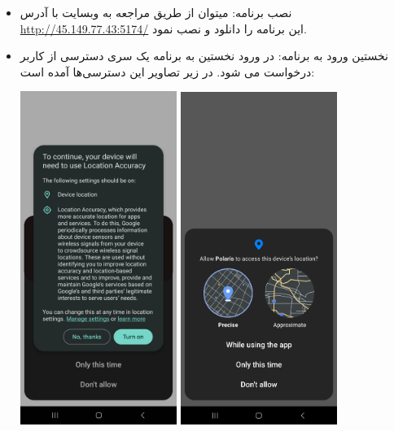 \begin{itemize}
	
	\item  نصب برنامه: میتوان از طریق مراجعه به وبسایت با آدرس \url{http://45.149.77.43:5174/} این برنامه را دانلود و نصب نمود.
	\item  نخستین ورود به برنامه: در ورود نخستین به برنامه یک سری دسترسی از کاربر درخواست می شود. در زیر تصاویر این دسترسی‌ها آمده است:
	\begin{center}
		\includegraphics[width=0.4\textwidth]{images/permission-location-1.jpg} 
		\includegraphics[width=0.4\textwidth]{images/permission-location-2.jpg} 

\end{center}
\end{itemize}

